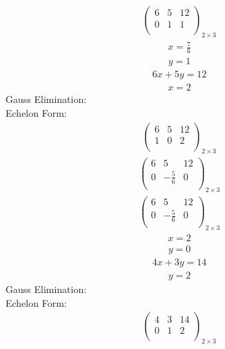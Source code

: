 \documentclass{article}
\begin{document}
\begin{align*}
\left(
\begin{array}{cc|c}
6 & 5 & 12\\
0 & 1 & 1\\
\end{array}
\right)_{2\times 3}
\end{align*}
\begin{align*}
x=\frac{7}{6}\end{align*}
\begin{align*}
y=1\end{align*}
\begin{align*}
6x + 5y=12\end{align*}
\begin{align*}
x=2\end{align*}
Gauss Elimination:\\
Echelon Form:\\
\begin{align*}
\left(
\begin{array}{cc|c}
6 & 5 & 12\\
1 & 0 & 2\\
\end{array}
\right)_{2\times 3}
\end{align*}
\begin{align*}
\left(
\begin{array}{cc|c}
6 & 5 & 12\\
0 & -\frac{5}{6} & 0\\
\end{array}
\right)_{2\times 3}
\end{align*}
\begin{align*}
\left(
\begin{array}{cc|c}
6 & 5 & 12\\
0 & -\frac{5}{6} & 0\\
\end{array}
\right)_{2\times 3}
\end{align*}
\begin{align*}
x=2\end{align*}
\begin{align*}
y=0\end{align*}
\begin{align*}
4x + 3y=14\end{align*}
\begin{align*}
y=2\end{align*}
Gauss Elimination:\\
Echelon Form:\\
\begin{align*}
\left(
\begin{array}{cc|c}
4 & 3 & 14\\
0 & 1 & 2\\
\end{array}
\right)_{2\times 3}
\end{align*}
\end{document}
